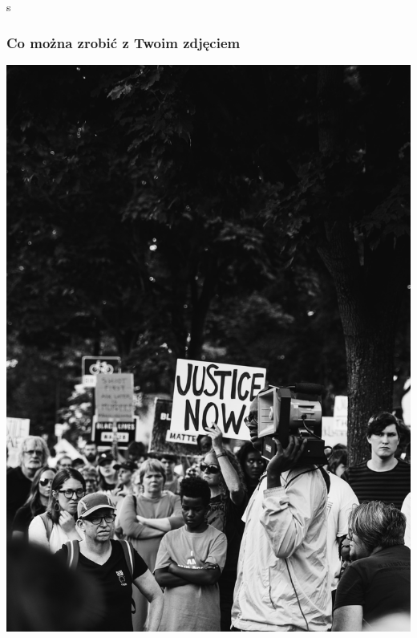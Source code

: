 \documentclass{beamer}
\begin{document}
            \begin{frame}
                \begin{center}s
                    \frametitle{Co można zrobić z Twoim zdjęciem}
                    \includegraphics[height=0.8\textheight]{pictures/protest.jpg}
                \end{center}
            \end{frame}
\end{document}
